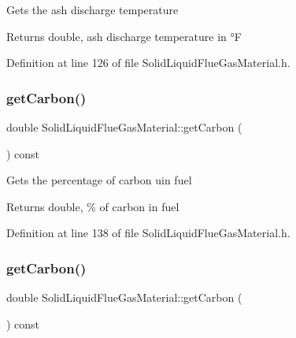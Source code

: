 Gets the ash discharge temperature \begin{DoxyReturn}{Returns}
double, ash discharge temperature in °F 
\end{DoxyReturn}


Definition at line 126 of file Solid\+Liquid\+Flue\+Gas\+Material.\+h.

\mbox{\label{class_solid_liquid_flue_gas_material_a7b8a98111943d30094e2d6950f7f2ec1}} 
\subsubsection{\texorpdfstring{get\+Carbon()}{getCarbon()}\hspace{0.1cm}{\footnotesize\ttfamily [1/3]}}
{\footnotesize\ttfamily double Solid\+Liquid\+Flue\+Gas\+Material\+::get\+Carbon (\begin{DoxyParamCaption}{ }\end{DoxyParamCaption}) const\hspace{0.3cm}{\ttfamily [inline]}}

Gets the percentage of carbon uin fuel \begin{DoxyReturn}{Returns}
double, \% of carbon in fuel 
\end{DoxyReturn}


Definition at line 138 of file Solid\+Liquid\+Flue\+Gas\+Material.\+h.

\mbox{\label{class_solid_liquid_flue_gas_material_a7b8a98111943d30094e2d6950f7f2ec1}} 
\subsubsection{\texorpdfstring{get\+Carbon()}{getCarbon()}\hspace{0.1cm}{\footnotesize\ttfamily [2/3]}}
{\footnotesize\ttfamily double Solid\+Liquid\+Flue\+Gas\+Material\+::get\+Carbon (\begin{DoxyParamCaption}{ }\end{DoxyParamCaption}) const\hspace{0.3cm}{\ttfamily [inline]}}

